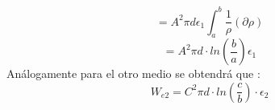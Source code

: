 \documentclass[
  11pt,
  letterpaper,
   addpoints,
  ]{exam}
\begin{document}
\begin{questions}
\begin{solution}
\begin{enumerate}
\begin{equation}
        \end{equation}
        \begin{equation}
            = A^{2} \pi d\epsilon_{1} \int_{a}^{b} \frac{1}{\rho} (\partial\rho)
        \end{equation}
        \begin{equation}
            = A^{2}\pi  d \cdot ln\left(\frac{b}{a}\right) \epsilon_{1}
        \end{equation}
        Análogamente para el otro medio se obtendrá que :
        \begin{equation}
            W_{e2}= C^{2} \pi d \cdot ln\left(\frac{c}{b}\right) \cdot \epsilon_{2}
        \end{equation}
    \end{enumerate}
\end{solution}

\end{questions}
\end{document}
